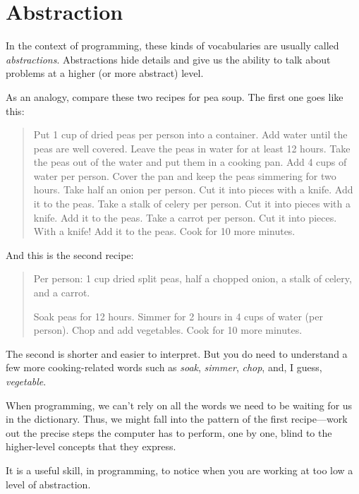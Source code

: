 \section{Abstraction}

In the context of programming, these kinds of vocabularies are usually called \emph{abstractions}. Abstractions hide details and give us the ability to talk about problems at a higher (or more abstract) level.

As an analogy, compare these two recipes for pea soup. The first one goes like this:

\begin{quote}

Put 1 cup of dried peas per person into a container. Add water until the peas are well covered. Leave the peas in water for at least 12 hours. Take the peas out of the water and put them in a cooking pan. Add 4 cups of water per person. Cover the pan and keep the peas simmering for two hours. Take half an onion per person. Cut it into pieces with a knife. Add it to the peas. Take a stalk of celery per person. Cut it into pieces with a knife. Add it to the peas. Take a carrot per person. Cut it into pieces. With a knife! Add it to the peas. Cook for 10 more minutes.
\end{quote}

And this is the second recipe:

\begin{quote}

Per person: 1 cup dried split peas, half a chopped onion, a stalk of celery, and a carrot.

Soak peas for 12 hours. Simmer for 2 hours in 4 cups of water (per person). Chop and add vegetables. Cook for 10 more minutes.
\end{quote}

The second is shorter and easier to interpret. But you do need to understand a few more cooking-related words such as \emph{soak}, \emph{simmer}, \emph{chop}, and, I guess, \emph{vegetable}.

When programming, we can't rely on all the words we need to be waiting for us in the dictionary. Thus, we might fall into the pattern of the first recipe—work out the precise steps the computer has to perform, one by one, blind to the higher-level concepts that they express.

It is a useful skill, in programming, to notice when you are working at too low a level of abstraction.

